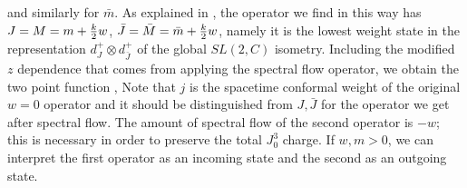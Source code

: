 \eqn{}
and similarly for $\bar m$.
As explained in \first ,  the operator we find in this way
has  $ J = M = m +  {k \over 2} w $, $\bar J = \bar M = \bar m +  {k \over 2}
w$, namely it is the lowest weight state in the representation
$d_J^+ \otimes d_{\bar J}^+$ of the global $SL(2,C)$ isometry.
Including the modified $z$ dependence that comes from applying the
spectral flow operator, we obtain the two point function \first ,
\eqn{}
Note that $j$ is the spacetime conformal weight of the original
$w=0$ operator and it should be distinguished from
$J, \bar J$ for the operator we get after spectral flow.
The amount of  spectral flow of the second operator is $-w$;
this is necessary in order to preserve the total $J_0^3$ charge.
If $w, m>0$, we can interpret the first operator as an incoming
state and the second as an outgoing state.

